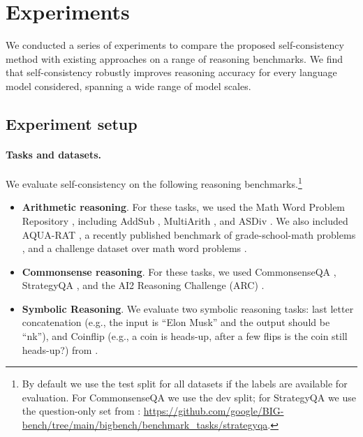 \documentclass{article} %
\begin{document}
\section{Experiments}
We conducted a series of experiments to compare the proposed self-consistency method with existing approaches on a range of reasoning benchmarks.
We find that self-consistency robustly improves reasoning accuracy for every language model considered, spanning a wide range of model scales.  %

\subsection{Experiment setup}

\paragraph{Tasks and datasets.} We evaluate self-consistency on the following reasoning benchmarks.\footnote{By default we use the test split for all datasets if the labels are available for evaluation. For CommonsenseQA we use the dev split; for StrategyQA we use the question-only set from \cite{bigbench}: \scriptsize{\url{https://github.com/google/BIG-bench/tree/main/bigbench/benchmark_tasks/strategyqa}}.}
\vspace{-0.05in}
\begin{itemize}[leftmargin=0.6cm]
    \item \textbf{Arithmetic reasoning}. For these tasks, we used the Math Word Problem Repository \citep{koncel-kedziorski-etal-2016-mawps}, including AddSub \citep{hosseini-etal-2014-learning}, MultiArith \citep{roy-roth-2015-solving}, and ASDiv \citep{miao-etal-2020-diverse}. We also included AQUA-RAT \citep{ling-etal-2017-program}, a recently published benchmark of grade-school-math problems \citep[GSM8K;][]{cobbe2021training}, and a challenge dataset over math word problems \citep[SVAMP;][]{patel-etal-2021-nlp}.
    \item \textbf{Commonsense reasoning}. 
    For these tasks, we used CommonsenseQA \citep{talmor-etal-2019-commonsenseqa},
    StrategyQA \citep{geva-etal-2021-aristotle}, 
    and the AI2 Reasoning Challenge (ARC) \citep{Clark2018ThinkYH}.
    \item \textbf{Symbolic Reasoning}. We evaluate two symbolic reasoning tasks: last letter concatenation (e.g., the input is ``Elon Musk'' and the output should be ``nk''), and Coinflip (e.g., a coin is heads-up, after a few flips is the coin still heads-up?) from \cite{wei2022chain}. 
\end{itemize}
\end{document}

